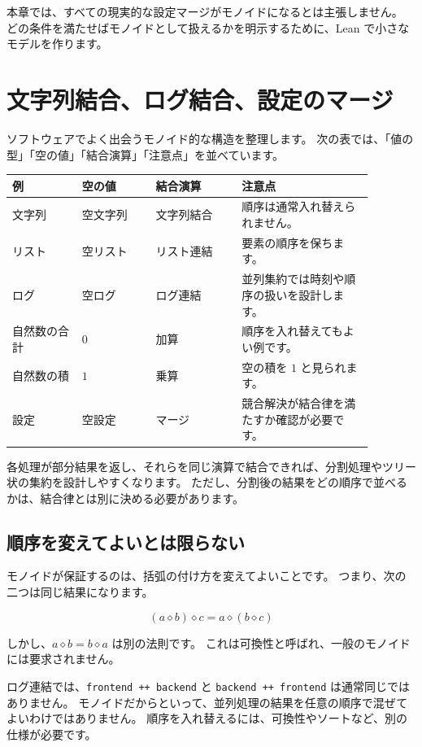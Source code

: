 本章では、すべての現実的な設定マージがモノイドになるとは主張しません。
どの条件を満たせばモノイドとして扱えるかを明示するために、Lean で小さなモデルを作ります。

\section{文字列結合、ログ結合、設定のマージ}

ソフトウェアでよく出会うモノイド的な構造を整理します。
次の表では、「値の型」「空の値」「結合演算」「注意点」を並べています。

\begin{small}
\begin{longtable}{@{}p{0.17\linewidth}p{0.18\linewidth}p{0.21\linewidth}p{0.32\linewidth}@{}}
\toprule
例 & 空の値 & 結合演算 & 注意点 \\
\midrule
文字列 & 空文字列 & 文字列結合 & 順序は通常入れ替えられません。 \\
リスト & 空リスト & リスト連結 & 要素の順序を保ちます。 \\
ログ & 空ログ & ログ連結 & 並列集約では時刻や順序の扱いを設計します。 \\
自然数の合計 & \(0\) & 加算 & 順序を入れ替えてもよい例です。 \\
自然数の積 & \(1\) & 乗算 & 空の積を \(1\) と見られます。 \\
設定 & 空設定 & マージ & 競合解決が結合律を満たすか確認が必要です。 \\
\bottomrule
\end{longtable}
\end{small}

各処理が部分結果を返し、それらを同じ演算で結合できれば、分割処理やツリー状の集約を設計しやすくなります。
ただし、分割後の結果をどの順序で並べるかは、結合律とは別に決める必要があります。

\subsection{順序を変えてよいとは限らない}

モノイドが保証するのは、括弧の付け方を変えてよいことです。
つまり、次の二つは同じ結果になります。

\[
  (a \diamond b) \diamond c
  =
  a \diamond (b \diamond c)
\]

しかし、\(a \diamond b = b \diamond a\) は別の法則です。
これは可換性と呼ばれ、一般のモノイドには要求されません。

ログ連結では、\texttt{frontend ++ backend} と \texttt{backend ++ frontend} は通常同じではありません。
モノイドだからといって、並列処理の結果を任意の順序で混ぜてよいわけではありません。
順序を入れ替えるには、可換性やソートなど、別の仕様が必要です。

